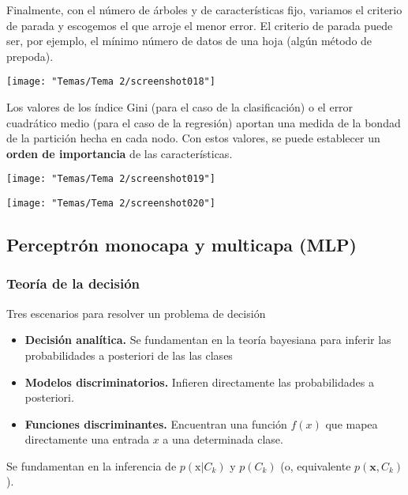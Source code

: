 \begin{minipage}{0.4\textwidth}
Finalmente, con el número de árboles
y de características fijo, variamos el
criterio de parada y escogemos el que
arroje el menor error. El criterio de
parada puede ser, por ejemplo, el
mínimo número de datos de una hoja
(algún método de prepoda).
\end{minipage}\qquad\begin{minipage}{0.55\textwidth}
\begin{center}
	\texttt{[image: "Temas/Tema 2/screenshot018"]}
\end{center}

\end{minipage}
\begin{minipage}{0.5\textwidth}
	Los valores de los índice Gini (para el caso de la clasificación)
o el error cuadrático medio (para el caso de la regresión)
aportan una medida de la bondad de la partición hecha en
cada nodo. Con estos valores, se puede establecer un \textbf{orden de importancia} de las características. 
\end{minipage}\qquad\begin{minipage}{0.5\textwidth}
\begin{center}
	\texttt{[image: "Temas/Tema 2/screenshot019"]}
\end{center}
\end{minipage}
\begin{center}
	\texttt{[image: "Temas/Tema 2/screenshot020"]}
\end{center}
\subsection{Perceptrón monocapa y multicapa (MLP)}
\subsubsection{Teoría de la decisión}
Tres escenarios para resolver un problema de decisión
\begin{itemize}
	\item \textbf{Decisión analítica.} Se fundamentan en la teoría bayesiana para inferir las probabilidades a posteriori de las las clases
	\item \textbf{Modelos discriminatorios.} Infieren directamente las probabilidades a posteriori.
	\item \textbf{Funciones discriminantes.} Encuentran una función $f(x)$ que mapea directamente una entrada $x$ a una determinada clase.
\end{itemize}
Se fundamentan en la inferencia de $p(\mathrm{x}|C_k)$ y $p(C_k)$ (o, equivalente $p(\mathbf{x},C_k)$).

